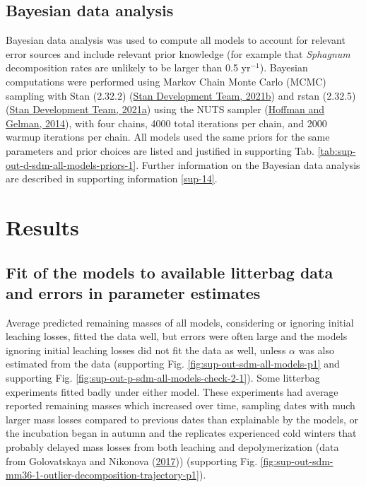 \documentclass[
  12pt,
]{article}
\begin{document}
\hypertarget{bayesian-data-analysis}{%
\subsection{Bayesian data analysis}\label{bayesian-data-analysis}}

Bayesian data analysis was used to compute all models to account for relevant error sources and include relevant prior knowledge (for example that \emph{Sphagnum} decomposition rates are unlikely to be larger than 0.5 yr\(^{-1}\)). Bayesian computations were performed using Markov Chain Monte Carlo (MCMC) sampling with Stan (2.32.2) (\protect\hyperlink{ref-StanDevelopmentTeam.2021a}{Stan Development Team, 2021b}) and rstan (2.32.5) (\protect\hyperlink{ref-StanDevelopmentTeam.2021b}{Stan Development Team, 2021a}) using the NUTS sampler (\protect\hyperlink{ref-Hoffman.2014}{Hoffman and Gelman, 2014}), with four chains, 4000 total iterations per chain, and 2000 warmup iterations per chain. All models used the same priors for the same parameters and prior choices are listed and justified in supporting Tab. \ref{tab:sup-out-d-sdm-all-models-priors-1}. Further information on the Bayesian data analysis are described in supporting information \ref{sup-14}.

\hypertarget{results}{%
\section{Results}\label{results}}

\hypertarget{fit-of-the-models-to-available-litterbag-data-and-errors-in-parameter-estimates}{%
\subsection{Fit of the models to available litterbag data and errors in parameter estimates}\label{fit-of-the-models-to-available-litterbag-data-and-errors-in-parameter-estimates}}

Average predicted remaining masses of all models, considering or ignoring initial leaching losses, fitted the data well, but errors were often large and the models ignoring initial leaching losses did not fit the data as well, unless \(\alpha\) was also estimated from the data (supporting Fig. \ref{fig:sup-out-sdm-all-models-p1} and supporting Fig. \ref{fig:sup-out-p-sdm-all-models-check-2-1}).
Some litterbag experiments fitted badly under either model. These experiments had average reported remaining masses which increased over time, sampling dates with much larger mass losses compared to previous dates than explainable by the models, or the incubation began in autumn and the replicates experienced cold winters that probably delayed mass losses from both leaching and depolymerization (data from Golovatskaya and Nikonova (\protect\hyperlink{ref-Golovatskaya.2017}{2017})) (supporting Fig. \ref{fig:sup-out-sdm-mm36-1-outlier-decomposition-trajectory-p1}).
\end{document}
